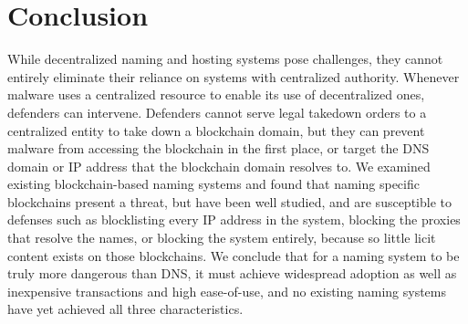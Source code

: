 \section{Conclusion}

While decentralized naming and hosting systems pose challenges, they cannot 
entirely 
eliminate their reliance on systems with centralized authority. Whenever 
malware uses a centralized 
resource to enable its use of decentralized ones, defenders can intervene. 
Defenders cannot serve 
legal takedown orders to a centralized entity to take 
down a blockchain domain, but they can prevent malware from accessing the 
blockchain in the first 
place, or target the DNS domain or IP address that the blockchain domain 
resolves to. We examined existing blockchain-based naming systems and found 
that naming specific 
blockchains present a threat, but have been well studied, and are susceptible 
to defenses such as 
blocklisting every IP address in the system, blocking the proxies that resolve 
the names, or blocking 
the system entirely, because so little licit 
content exists on those blockchains. We conclude that for a naming system to be 
truly more dangerous 
than DNS, it must achieve widespread adoption as well as inexpensive 
transactions and high 
ease-of-use, and no existing naming systems have yet achieved all three 
characteristics. 